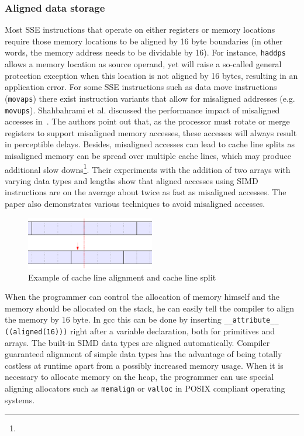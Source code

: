 \subsubsection{Aligned data storage} 
Most SSE instructions that operate on either registers or memory locations require those memory locations to be aligned by 16 byte boundaries (in other words, the memory address needs to be dividable by 16). For instance, \texttt{haddps} allows a memory location as source operand, yet will raise a so-called general protection exception when this location is not aligned by 16 bytes, resulting in an application error. For some SSE instructions such as data move instructions (\texttt{movaps}) there exist instruction variants that allow for misaligned addresses (e.g. \texttt{movups}). Shahbahrami et al. discussed the performance impact of misaligned accesses in~\cite{shahbahrami2006misaligned}. The authors point out that, as the processor must rotate or merge registers to support misaligned memory accesses, these accesses will always result in perceptible delays. Besides, misaligned accesses can lead to cache line splits as misaligned memory can be spread over multiple cache lines, which may produce additional slow downs\footnote{}. Their experiments with the addition of two arrays with varying data types and lengths show that aligned accesses using SIMD instructions are on the average about twice as fast as misaligned accesses. The paper also demonstrates various techniques to avoid misaligned accesses.

\begin{figure}[h]
\begin{center}
\includegraphics[width=0.5\textwidth]{img/cachelinesplit.eps}
\end{center}
\caption{Example of cache line alignment and cache line split}
\label{fig:cachelinesplit}
\end{figure}

When the programmer can control the allocation of memory himself and the memory should be allocated on the stack, he can easily tell the compiler to align the memory by 16 byte. In gcc this can be done by inserting \texttt{\_\_attribute\_\_ ((aligned(16)))} right after a variable declaration, both for primitives and arrays. The built-in SIMD data types are aligned automatically. Compiler guaranteed alignment of simple data types has the advantage of being totally costless at runtime apart from a possibly increased memory usage. When it is necessary to allocate memory on the heap, the programmer can use special aligning allocators such as \texttt{memalign} or \texttt{valloc} in POSIX compliant operating systems. 

